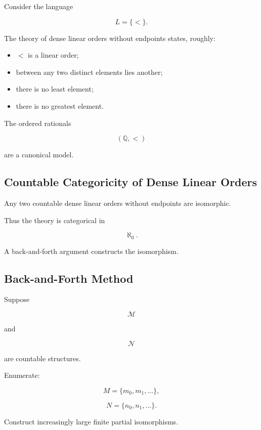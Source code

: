Consider the language

\[
L=\{<\}.
\]

The theory of dense linear orders without endpoints states, roughly:

\begin{itemize}
    \item \(<\) is a linear order;
    \item between any two distinct elements lies another;
    \item there is no least element;
    \item there is no greatest element.
\end{itemize}

The ordered rationals

\[
\boxed{
(\mathbb{Q},<)
}
\]

are a canonical model.

\subsection{Countable Categoricity of Dense Linear Orders}
\label{subsec:dlo-countable-categoricity}

Any two countable dense linear orders without endpoints are isomorphic.

Thus the theory is categorical in

\[
\boxed{
\aleph_0.
}
\]

A back-and-forth argument constructs the isomorphism.

\subsection{Back-and-Forth Method}
\label{subsec:back-and-forth}

Suppose

\[
\mathcal{M}
\]

and

\[
\mathcal{N}
\]

are countable structures.

Enumerate:

\[
M
=
\{m_0,m_1,\ldots\},
\]

\[
N
=
\{n_0,n_1,\ldots\}.
\]

Construct increasingly large finite partial isomorphisms.

